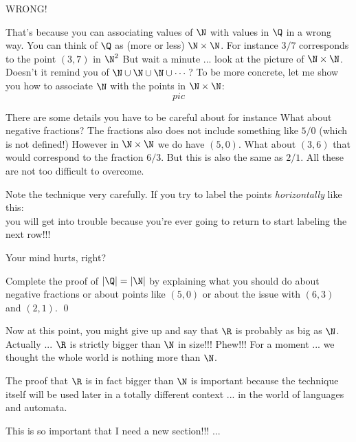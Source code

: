 WRONG!

That's because you can associating values of $\N$ with values in $\Q$
in a wrong way.
You can think of $\Q$ as (more or less) $\N \times \N$.
For instance $3/7$ corresponds to the point $(3, 7)$ in $\N^2$
But wait a minute ... look at the picture of $\N \times \N$.
Doesn't it remind you of $\N \cup \N \cup \N \cup \cdots$?
To be more concrete, let me show you how to associate $\N$ with
the points in $\N \times \N$:
\[
pic
\]

There are some details you have to be careful about for instance
What about negative fractions?
The fractions also does not include something like $5/0$
(which is not defined!)
However in $\N \times \N$ we do have $(5, 0)$.
What about $(3, 6)$ that would correspond to the fraction $6/3$.
But this is also the same as $2/1$.
All these are not too difficult to overcome.

Note the technique very carefully.
If you try to label the points \textit{horizontally} like this:
\[
\]
you will get into trouble because you're ever going to return to 
start labeling the next row!!!

Your mind hurts, right?

\begin{ex}
Complete the proof of $|\Q| = |\N|$ by explaining what you should
do about negative fractions or about points like $(5, 0)$
or about the issue with $(6,3)$ and $(2,1)$.
\qed
\end{ex}

Now at this point, you might give up and say that $\R$ is probably
as big as $\N$.
Actually ... $\R$ is strictly bigger than $\N$ in size!!!
Phew!!! For a moment ... we thought the whole world is nothing more than
$\N$.

The proof that $\R$ is in fact bigger than $\N$ is important 
because the technique itself will be used later in a totally different
context ... in the world of languages and automata.

This is so important that I need a new section!!! ...
